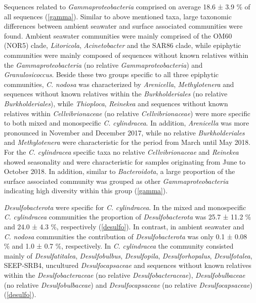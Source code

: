 \documentclass[12pt,]{article}
\begin{document}
Sequences related to \emph{Gammaproteobacteria} comprised on average
18.6 ± 3.9 \si{\percent} of all sequences (\autoref{gamma}). Similar to
above mentioned taxa, large taxonomic differences between ambient
seawater and surface associated communities were found. Ambient seawater
communities were mainly comprised of the OM60 (NOR5) clade,
\emph{Litoricola}, \emph{Acinetobacter} and the SAR86 clade, while
epiphytic communities were mainly composed of sequences without known
relatives within the \emph{Gammaproteobacteria} (no relative
\emph{Gammaproteobacteria}) and \emph{Granulosicoccus}. Beside these two
groups specific to all three epiphytic communities, \emph{C. nodosa} was
characterized by \emph{Arenicella}, \emph{Methylotenera} and sequences
without known relatives within the \emph{Burkholderiales} (no relative
\emph{Burkholderiales}), while \emph{Thioploca}, \emph{Reinekea} and
sequences without known relatives within \emph{Cellvibrionaceae} (no
relative \emph{Cellvibrionaceae}) were more specific to both mixed and
monospecific \emph{C. cylindracea}. In addition, \emph{Arenicella} was
more pronounced in November and December 2017, while no relative
\emph{Burkholderiales} and \emph{Methylotenera} were characteristic for
the period from March until May 2018. For the \emph{C. cylindracea}
specific taxa no relative \emph{Cellvibrionaceae} and \emph{Reinekea}
showed seasonality and were characteristic for samples originating from
June to October 2018. In addition, similar to \emph{Bacteroidota}, a
large proportion of the surface associated community was grouped as
other \emph{Gammaproteobacteria} indicating high diversity within this
group (\autoref{gamma}).

\emph{Desulfobacterota} were specific for \emph{C. cylindracea}. In the
mixed and monospecific \emph{C. cylindracea} communities the proportion
of \emph{Desulfobacterota} was 25.7 ± 11.2 \si{\percent} and 24.0 ± 4.3
\si{\percent}, respectively (\autoref{desulfo}). In contrast, in ambient
seawater and \emph{C. nodosa} communities the contribution of
\emph{Desulfobacterota} was only 0.1 ± 0.08 \si{\percent} and 1.0 ± 0.7
\si{\percent}, respectively. In \emph{C. cylindracea} the community
consisted mainly of \emph{Desulfatitalea}, \emph{Desulfobulbus},
\emph{Desulfopila}, \emph{Desulforhopalus}, \emph{Desulfotalea},
SEEP-SRB4, uncultured \emph{Desulfocapsaceae} and sequences without
known relatives within the \emph{Desulfobacteraceae} (no relative
\emph{Desulfobacteraceae}), \emph{Desulfobulbaceae} (no relative
\emph{Desulfobulbaceae}) and \emph{Desulfocapsaceae} (no relative
\emph{Desulfocapsaceae}) (\autoref{desulfo}).
\end{document}
